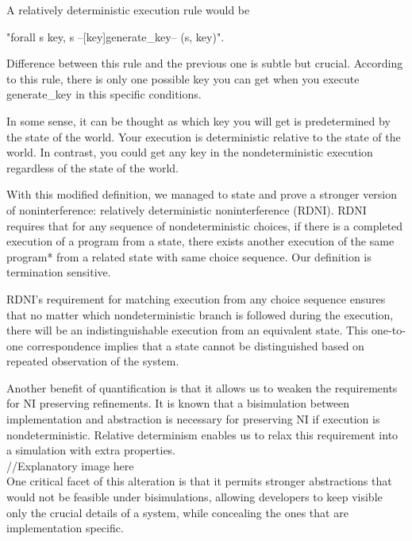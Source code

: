 \documentclass[onecolumn]{paper}
\begin{document}
A relatively deterministic execution rule would be

"forall s key, s --[key]generate\_key-- (s, key)".

Difference between this rule and the previous one is subtle but crucial. 
According to this rule, there is only one possible key you can get when you execute generate\_key in this specific conditions.

In some sense, it can be thought as which key you will get is predetermined by the state of the world. Your execution is deterministic relative to the state of the world.
In contrast, you could get any key in the nondeterministic execution regardless of the state of the world.




With this modified definition, we managed to state and prove a stronger version of noninterference: relatively deterministic noninterference (RDNI). RDNI requires that for any sequence of nondeterministic choices, if there is a completed execution of a program from a state, there exists another execution of the same program* from a related state with same choice sequence. Our definition is termination sensitive.

RDNI's requirement for matching execution from any choice sequence ensures that no matter which nondeterministic branch is followed during the execution, there will be an indistinguishable execution from an equivalent state. This one-to-one correspondence implies that a state cannot be distinguished based on repeated observation of the system.

Another benefit of quantification is that it allows us to weaken the requirements for NI preserving refinements. It is known that a bisimulation between implementation and abstraction is necessary for preserving NI if execution is nondeterministic. Relative determinism enables us to relax this requirement into a simulation with extra properties. \\

//Explanatory image here\\

One critical facet of this alteration is that it permits stronger abstractions that would not be feasible under bisimulations, allowing developers to keep visible only the crucial details of a system, while concealing the ones that are implementation specific.\\
\end{document}
